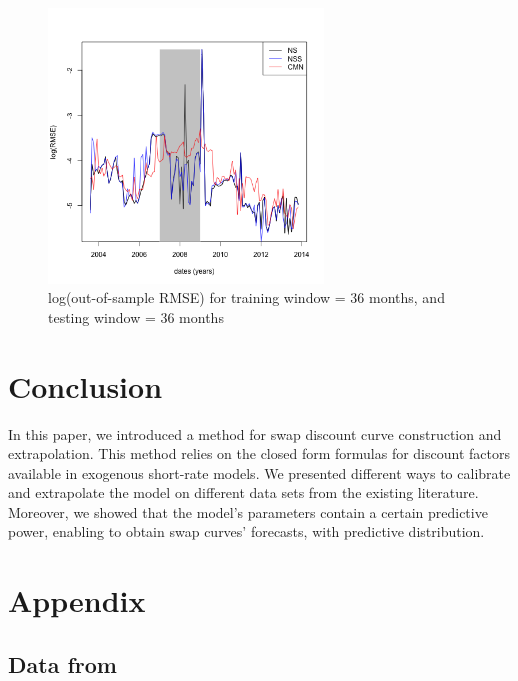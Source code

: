\begin{figure}[!htb]
\centering
  \includegraphics[width=0.65\textwidth]{gfx/chapter-yc-insurance/forecasting_graph8}
\caption{log(out-of-sample RMSE) for training window = 36 months, and testing window = 36 months}
\label{forecast:8}       %
\end{figure}

\section{Conclusion}

In this paper, we introduced a method for swap discount curve construction and extrapolation. This method relies on the closed form formulas for discount factors available in exogenous short-rate models. We presented different ways to calibrate and extrapolate the model on different data sets from the existing literature. Moreover, we showed that the model's parameters contain a certain predictive power, enabling to obtain swap curves' forecasts, with predictive distribution.


\newpage

\section{Appendix}

\subsection{Data from \cite{andersen2010interest}}

